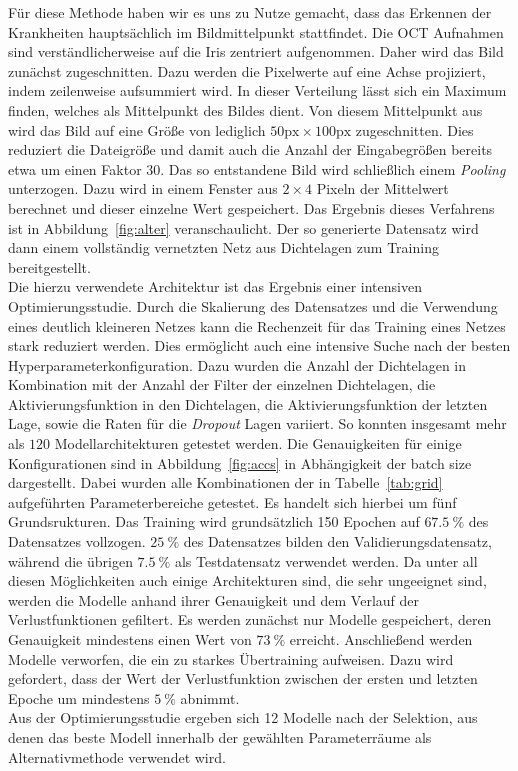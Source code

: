 %
Für diese Methode haben wir es uns zu Nutze gemacht, dass das Erkennen der
Krankheiten hauptsächlich im Bildmittelpunkt stattfindet. Die OCT Aufnahmen
sind verständlicherweise auf die Iris zentriert aufgenommen.
Daher wird das Bild zunächst zugeschnitten. Dazu werden die Pixelwerte auf eine
Achse projiziert, indem zeilenweise aufsummiert wird. In dieser Verteilung
lässt sich ein Maximum finden, welches als Mittelpunkt des Bildes dient.
Von diesem Mittelpunkt aus wird das Bild auf eine Größe von lediglich
$50\text{px}\times100\text{px}$ zugeschnitten. Dies reduziert die Dateigröße
und damit auch die Anzahl der Eingabegrößen bereits etwa um einen
Faktor $30$.
Das so entstandene Bild wird schließlich einem \textit{Pooling} unterzogen.
Dazu wird in einem Fenster aus $2\times4$ Pixeln der Mittelwert berechnet und
dieser einzelne Wert gespeichert. Das Ergebnis dieses Verfahrens ist in
Abbildung~\ref{fig:alter} veranschaulicht.
Der so generierte Datensatz wird dann einem vollständig vernetzten Netz aus
Dichtelagen zum Training bereitgestellt. \\
Die hierzu verwendete Architektur ist das Ergebnis einer intensiven
Optimierungsstudie. Durch die Skalierung des Datensatzes und die Verwendung
eines deutlich kleineren Netzes kann die Rechenzeit für das Training eines
Netzes stark reduziert werden. Dies ermöglicht auch eine intensive Suche nach
der besten Hyperparameterkonfiguration. Dazu wurden die Anzahl der Dichtelagen
in Kombination mit der Anzahl der Filter der einzelnen Dichtelagen, die
Aktivierungsfunktion in den Dichtelagen, die Aktivierungsfunktion der
letzten Lage, sowie die Raten für die \textit{Dropout} Lagen variiert. So
konnten insgesamt mehr als $120$ Modellarchitekturen getestet werden. Die
Genauigkeiten für einige Konfigurationen sind in Abbildung~\ref{fig:accs} in
Abhängigkeit der batch size dargestellt.
Dabei wurden alle Kombinationen der in Tabelle~\ref{tab:grid} aufgeführten
Parameterbereiche getestet. Es handelt sich hierbei um fünf Grundsrukturen.
Das Training wird grundsätzlich 150 Epochen auf $\SI{67.5}{\percent}$ des
Datensatzes vollzogen. $\SI{25}{\percent}$ des Datensatzes bilden den
Validierungsdatensatz, während die übrigen $\SI{7.5}{\percent}$ als
Testdatensatz verwendet werden.
Da unter all diesen Möglichkeiten auch einige Architekturen sind, die sehr
ungeeignet sind, werden die Modelle anhand ihrer Genauigkeit und dem Verlauf
der Verlustfunktionen gefiltert. Es werden zunächst nur Modelle gespeichert,
deren Genauigkeit mindestens einen Wert von $\SI{73}{\percent}$ erreicht.
Anschließend werden Modelle verworfen, die ein zu starkes Übertraining
aufweisen. Dazu wird gefordert, dass der Wert der Verlustfunktion zwischen der
ersten und letzten Epoche um mindestens $\SI{5}{\percent}$ abnimmt.\\
Aus der Optimierungsstudie ergeben sich 12 Modelle nach der Selektion, aus
denen das beste Modell innerhalb der gewählten Parameterräume als
Alternativmethode verwendet wird.

